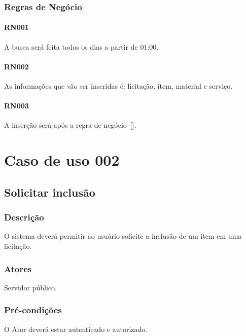 \begin{anexosenv}
\subsection*{Regras de Negócio}
\subsubsection*{RN001}\label{rn009}
A busca será feita todos os dias a partir de 01:00.
\subsubsection*{RN002}\label{rn010}
As informações que vão ser inseridas é: licitação, item, material e serviço.
\subsubsection*{RN003}\label{rn011}
A inserção será após a regra de negócio~[].

\chapter{Caso de uso 002}\label{CASO002}

\section*{Solicitar inclusão}

\subsection*{Descrição}
O sistema deverá permitir ao usuário solicite a inclusão de um item em uma licitação.

\subsection*{Atores}
Servidor público.

\subsection*{Pré-condições}
O Ator deverá estar autenticado e autorizado.


\end{anexosenv}
